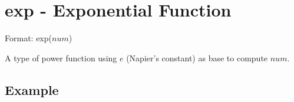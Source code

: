 
%

\section{exp - Exponential Function\label{sect:exp}}

Format: exp($num$)

A type of power function using $e$ (Napier’s constant) as base to compute $num$. 

\subsection*{Example}


%
